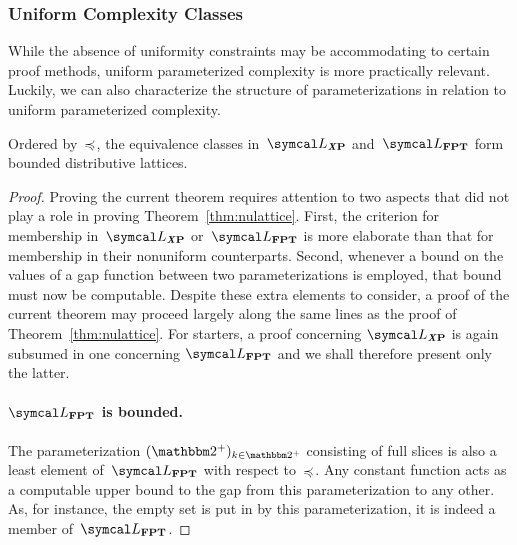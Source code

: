 \subsubsection{Uniform Complexity Classes}
While the absence of uniformity constraints may be accommodating to certain proof methods, uniform parameterized complexity is more practically relevant.
Luckily, we can also characterize the structure of parameterizations in relation to uniform parameterized complexity.
\begin{theorem}
\label{thm:lattice}%
  Ordered by~$\preccurlyeq$, the equivalence classes in~$\calL_\clX{P}$ and~$\calL_\cl{FPT}$ form bounded distributive lattices.
\end{theorem}
\begin{proof}
  Proving the current theorem requires attention to two aspects that did not play a role in proving  Theorem~\ref{thm:nulattice}.
  First, the criterion for membership in~$\calL_\clX{P}$ or~$\calL_\cl{FPT}$ is more elaborate than that for membership in their nonuniform counterparts.
  Second, whenever a bound on the values of a gap function between two parameterizations is employed, that bound must now be computable.
  Despite these extra elements to consider, a proof of the current theorem may proceed largely along the same lines as the proof of Theorem~\ref{thm:nulattice}.
  For starters, a proof concerning $\calL_\clX{P}$ is again subsumed in one concerning $\calL_\cl{FPT}$ and we shall therefore present only the latter.

  \paragraph{$\calL_\cl{FPT}$ is bounded.}
  The parameterization $(\binary^+)_{k \in \binary^+}$ consisting of full slices is also a least element of~$\calL_\cl{FPT}$ with respect to~$\preccurlyeq$.
  Any constant function acts as a computable upper bound to the gap from this parameterization to any other.
  As, for instance, the empty set is put in  by this parameterization, it is indeed a member of~$\calL_\cl{FPT}$.


\end{proof}
